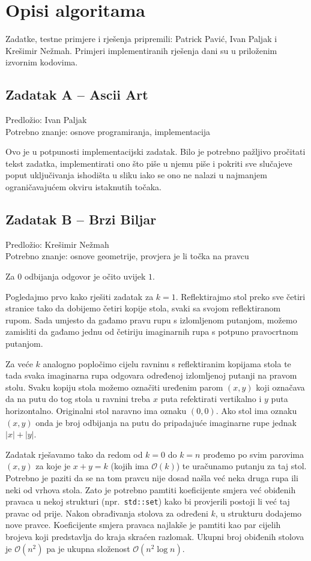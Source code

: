 \documentclass[a4paper]{article}
\begin{document}
\section*{Opisi algoritama}
Zadatke, testne primjere i rješenja pripremili: Patrick Pavić, Ivan Paljak i
Krešimir Nežmah. Primjeri implementiranih rješenja dani su u priloženim
izvornim kodovima.

\subsection*{Zadatak A -- Ascii Art}
\textsf{Predložio: Ivan Paljak}\\
\textsf{Potrebno znanje: osnove programiranja, implementacija}

Ovo je u potpunosti implementacijski zadatak. Bilo je potrebno pažljivo
pročitati tekst zadatka, implementirati ono što piše u njemu piše i pokriti
sve slučajeve poput uključivanja ishodišta u sliku iako se ono ne nalazi u
najmanjem ograničavajućem okviru istaknutih točaka.

\subsection*{Zadatak B -- Brzi Biljar}
\textsf{Predložio: Krešimir Nežmah}\\
\textsf{Potrebno znanje: osnove geometrije, provjera je li točka na
pravcu}

Za $0$ odbijanja odgovor je očito uvijek $1$.

Pogledajmo prvo kako rješiti zadatak za $k = 1$. Reflektirajmo stol preko sve
četiri stranice tako da dobijemo četiri kopije stola, svaki sa svojom
reflektiranom rupom. Sada umjesto da gađamo pravu rupu s izlomljenom putanjom,
možemo zamisliti da gađamo jednu od četiriju imaginarnih rupa s potpuno
pravocrtnom putanjom.

Za veće $k$ analogno popločimo cijelu ravninu s reflektiranim kopijama stola te
tada svaka imaginarna rupa odgovara određenoj izlomljenoj putanji na pravom
stolu. Svaku kopiju stola možemo označiti uređenim parom $(x,y)$ koji označava
da na putu do tog stola u ravnini treba $x$ puta refektirati vertikalno i $y$
puta horizontalno. Originalni stol naravno ima oznaku $(0,0)$. Ako stol ima
oznaku $(x,y)$ onda je broj odbijanja na putu do pripadajuće imaginarne rupe
jednak $|x|+|y|$.

Zadatak rješavamo tako da redom od $k=0$ do $k=n$ prođemo po svim parovima
$(x,y)$ za koje je $x+y=k$ (kojih ima $\mathcal{O}(k)$) te uračunamo putanju za
taj stol. Potrebno je paziti da se na tom pravcu nije dosad našla već neka
druga rupa ili neki od vrhova stola. Zato je potrebno pamtiti koeficijente
smjera već obiđenih pravaca u nekoj strukturi (npr.\ \texttt{std::set}) kako bi
provjerili postoji li već taj pravac od prije. Nakon obrađivanja stolova za
određeni $k$, u strukturu dodajemo nove pravce. Koeficijente smjera pravaca
najlakše je pamtiti kao par cijelih brojeva koji predstavlja do kraja skraćen
razlomak. Ukupni broj obiđenih stolova je $\mathcal{O}(n^2)$ pa je ukupna
složenost $\mathcal{O}(n^2 \log n)$.
\end{document}
